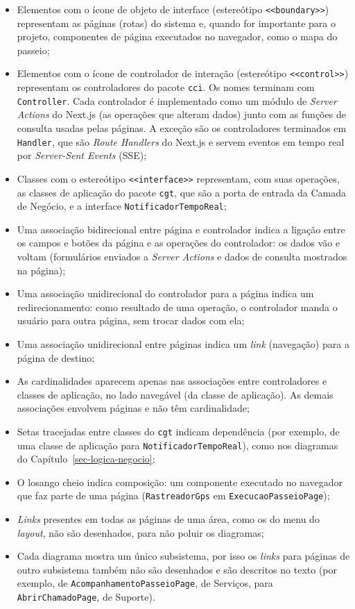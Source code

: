 \begin{itemize}
	\item Elementos com o ícone de objeto de interface (estereótipo \texttt{<<boundary>>}) representam as páginas (rotas) do sistema e, quando for importante para o projeto, componentes de página executados no navegador, como o mapa do passeio;
	\item Elementos com o ícone de controlador de interação (estereótipo \texttt{<<control>>}) representam os controladores do pacote \texttt{cci}. Os nomes terminam com \texttt{Controller}. Cada controlador é implementado como um módulo de \textit{Server Actions} do Next.js (as operações que alteram dados) junto com as funções de consulta usadas pelas páginas. A exceção são os controladores terminados em \texttt{Handler}, que são \textit{Route Handlers} do Next.js e servem eventos em tempo real por \textit{Server-Sent Events} (SSE);
	\item Classes com o estereótipo \texttt{<<interface>>} representam, com suas operações, as classes de aplicação do pacote \texttt{cgt}, que são a porta de entrada da Camada de Negócio, e a interface \texttt{NotificadorTempoReal};
	\item Uma associação bidirecional entre página e controlador indica a ligação entre os campos e botões da página e as operações do controlador: os dados vão e voltam (formulários enviados a \textit{Server Actions} e dados de consulta mostrados na página);
	\item Uma associação unidirecional do controlador para a página indica um redirecionamento: como resultado de uma operação, o controlador manda o usuário para outra página, sem trocar dados com ela;
	\item Uma associação unidirecional entre páginas indica um \textit{link} (navegação) para a página de destino;
	\item As cardinalidades aparecem apenas nas associações entre controladores e classes de aplicação, no lado navegável (da classe de aplicação). As demais associações envolvem páginas e não têm cardinalidade;
	\item Setas tracejadas entre classes do \texttt{cgt} indicam dependência (por exemplo, de uma classe de aplicação para \texttt{NotificadorTempoReal}), como nos diagramas do Capítulo~\ref{sec-logica-negocio};
	\item O losango cheio indica composição: um componente executado no navegador que faz parte de uma página (\texttt{RastreadorGps} em \texttt{ExecucaoPasseioPage});
	\item \textit{Links} presentes em todas as páginas de uma área, como os do menu do \textit{layout}, não são desenhados, para não poluir os diagramas;
	\item Cada diagrama mostra um único subsistema, por isso os \textit{links} para páginas de outro subsistema também não são desenhados e são descritos no texto (por exemplo, de \texttt{AcompanhamentoPasseioPage}, de Serviços, para \texttt{AbrirChamadoPage}, de Suporte).
\end{itemize}

